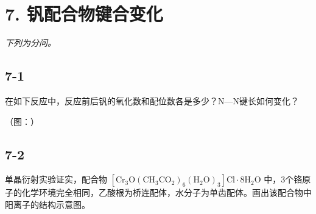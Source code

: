 \section*{7. 钒配合物键合变化}
\textit{下列为分问。}

\subsection*{7-1}
在如下反应中，反应前后钒的氧化数和配位数各是多少？N—N键⻓如何变化？

（图：）

\subsection*{7-2}
单晶衍射实验证实，配合物 $\mathrm { [ C r _ { 3 } O ( C H _ { 3 } C O _ { 2 } ) _ { 6 } ( H _ { 2 } O ) _ { 3 } ] C l \cdot 8 H _ { 2 } O }$ 中，3个铬原⼦的化学环境完全相同，⼄酸根为桥连配体，⽔分⼦为单⻮配体。画出该配合物中阳离⼦的结构⽰意图。
